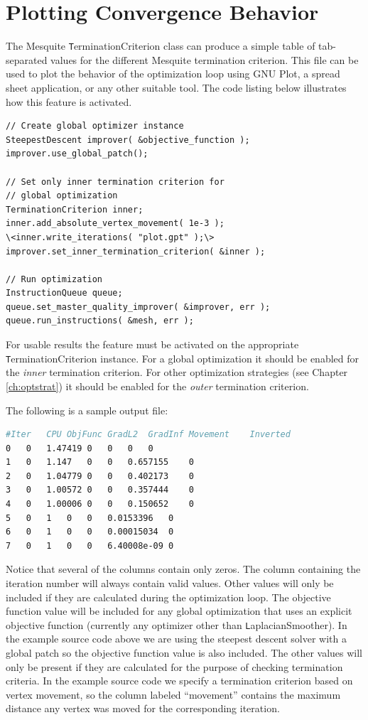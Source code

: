 \section{Plotting Convergence Behavior \label{sec:optplot}}

The Mesquite {\texttt TerminationCriterion} class can produce a simple table of tab-separated values for the different Mesquite termination criterion.	This file can be used to plot the behavior of the optimization loop using GNU Plot, a spread sheet application, or any other suitable tool.  The code listing below illustrates how this feature is activated.

\begin{lstlisting}[frame=single]
// Create global optimizer instance
SteepestDescent improver( &objective_function );
improver.use_global_patch();

// Set only inner termination criterion for
// global optimization
TerminationCriterion inner;
inner.add_absolute_vertex_movement( 1e-3 );
\<inner.write_iterations( "plot.gpt" );\>
improver.set_inner_termination_criterion( &inner );

// Run optimization
InstructionQueue queue;
queue.set_master_quality_improver( &improver, err );
queue.run_instructions( &mesh, err );
\end{lstlisting}

For usable results the feature must be activated on the appropriate {\texttt TerminationCriterion} instance.  For a global optimization it should be enabled for the {\em inner} termination criterion.	 For other optimization strategies (see Chapter \ref{ch:optstrat}) it should be enabled for the {\em outer} termination criterion.

The following is a sample output file:

\begin{lstlisting}[basicstyle=\small,language=make]
#Iter	CPU	ObjFunc GradL2	GradInf Movement	Inverted
0	0	1.47419 0	0	0	0
1	0	1.147	0	0	0.657155	0
2	0	1.04779 0	0	0.402173	0
3	0	1.00572 0	0	0.357444	0
4	0	1.00006 0	0	0.150652	0
5	0	1	0	0	0.0153396	0
6	0	1	0	0	0.00015034	0
7	0	1	0	0	6.40008e-09	0
\end{lstlisting}

Notice that several of the columns contain only zeros.	The column containing the iteration number will always contain valid values.  Other values will only be included if they are calculated during the optimization loop.  The objective function value will be included for any global optimization that uses an explicit objective function (currently any optimizer other than {\texttt LaplacianSmoother}).  In the example source code above we are using the steepest descent solver with a global patch so the objective function value is also included.  The other values will only be present if they are calculated for the purpose of checking termination criteria.  In the example source code we specify a termination criterion based on vertex movement, so the column labeled ``movement'' contains the maximum distance any vertex was moved for the corresponding iteration.

